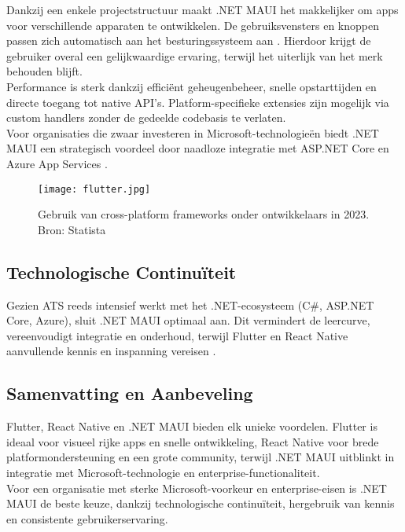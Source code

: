 Dankzij een enkele projectstructuur maakt .NET MAUI het makkelijker om apps voor verschillende apparaten te ontwikkelen. De gebruiksvensters en knoppen passen zich automatisch aan het besturingssysteem aan \autocite{Sheth2024}. Hierdoor krijgt de gebruiker overal een gelijkwaardige ervaring, terwijl het uiterlijk van het merk behouden blijft.\\

Performance is sterk dankzij efficiënt geheugenbeheer, snelle opstarttijden en directe toegang tot native API’s. Platform-specifieke extensies zijn mogelijk via custom handlers zonder de gedeelde codebasis te verlaten.\\

Voor organisaties die zwaar investeren in Microsoft-technologieën biedt .NET MAUI een strategisch voordeel door naadloze integratie met ASP.NET Core en Azure App Services \autocite{Klesman2023}.

\begin{figure}[h]
    \centering
    \texttt{[image: flutter.jpg]}
    \caption{Gebruik van cross-platform frameworks onder ontwikkelaars in 2023. Bron: Statista \autocite{Rodriguez2025}}
    \label{fig:flutter}
\end{figure}

\subsection{Technologische Continuïteit}
Gezien ATS reeds intensief werkt met het .NET-ecosysteem (C#, ASP.NET Core, Azure), sluit .NET MAUI optimaal aan. Dit vermindert de leercurve, vereenvoudigt integratie en onderhoud, terwijl Flutter en React Native aanvullende kennis en inspanning vereisen \autocite{Longe2025}.

\subsection{Samenvatting en Aanbeveling}
Flutter, React Native en .NET MAUI bieden elk unieke voordelen. Flutter is ideaal voor visueel rijke apps en snelle ontwikkeling, React Native voor brede platformondersteuning en een grote community, terwijl .NET MAUI uitblinkt in integratie met Microsoft-technologie en enterprise-functionaliteit.\\

Voor een organisatie met sterke Microsoft-voorkeur en enterprise-eisen is .NET MAUI de beste keuze, dankzij technologische continuïteit, hergebruik van kennis en consistente gebruikerservaring.

